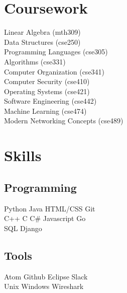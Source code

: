 \documentclass[]{deedy-resume-openfont}
\begin{document}
\begin{minipage}[t]{0.33\textwidth}

\section{Coursework}
Linear Algebra (mth309) \\
Data Structures (cse250) \\
Programming Languages (cse305) \\
Algorithms (cse331) \\
Computer Organization (cse341) \\
Computer Security (cse410) \\
Operating Systems (cse421) \\
Software Engineering (cse442) \\
Machine Learning (cse474) \\
Modern Networking Concepts (cse489) \\
\sectionsep


\section{Skills}
\subsection{Programming}
Python \textbullet{}   Java \textbullet{} HTML/CSS \textbullet{} Git \\
C++ \textbullet{} C \textbullet{} C\#  \textbullet{} Javascript \textbullet{} Go \\
SQL \textbullet{} Django
\sectionsep

\subsection{Tools}
Atom \textbullet{} Github \textbullet{} Eclipse \textbullet{} Slack \\
Unix \textbullet{} Windows \textbullet{} Wireshark \\
\sectionsep


\end{minipage}
\end{document}
